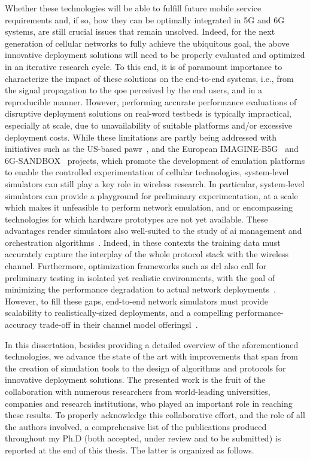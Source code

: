 Whether these technologies will be able to fulfill future mobile service requirements and, if so, how they can be optimally integrated in 5G and 6G systems, are still crucial issues that remain unsolved. 
Indeed, for the next generation of cellular networks to fully achieve the ubiquitous goal, the above innovative deployment solutions will need to be properly evaluated and optimized in an iterative research cycle. To this end, it is of paramount importance to characterize the impact of these solutions on the end-to-end systems, i.e., from the signal propagation to the \gls{qoe} perceived by the end users, and in a reproducible manner.
However, performing accurate performance evaluations of disruptive deployment solutions on real-word testbeds is typically impractical, especially at scale, due to unavailability of suitable platforms and/or excessive deployment costs.
While these limitations are partly being addressed with initiatives such as the US-based \gls{pawr}~\cite{BONATI2023109502}, and the European IMAGINE-B5G~\cite{10597052} and 6G-SANDBOX~\cite{10597112} projects, which promote the development of emulation platforms to enable the controlled experimentation of cellular technologies, system-level simulators can still play a key role in wireless research.
In particular, system-level simulators can provide a playground for preliminary experimentation, at a scale which makes it unfeasible to perform network emulation, and or encompassing technologies for which hardware prototypes are not yet available. 
These advantages render simulators also well-suited to the study of \gls{ai} management and orchestration algorithms~\cite{polese2022colo}.
Indeed, in these contexts the training data must accurately capture the interplay of the whole protocol stack with the wireless channel. Furthermore, optimization frameworks such as \gls{drl} also call for preliminary testing in isolated yet realistic environments, with the goal of minimizing the performance degradation to actual network deployments~\cite{lacava2022programmable, amir2023safehaul}.
However, to fill these gaps, end-to-end network simulators must provide scalability to realistically-sized deployments, and a compelling performance-accuracy trade-off in their channel model offeringsl~\cite{testolina2020scalable}.

In this dissertation, besides providing a detailed overview of the aforementioned technologies, we advance the state of the art with improvements that span from the creation of simulation tools to the design of algorithms and protocols for innovative deployment solutions.
The presented work is the fruit of the collaboration with numerous researchers from world-leading universities, companies and research institutions, who played an important role in reaching these results. To properly acknowledge this collaborative effort, and the role of all the
authors involved, a comprehensive list of the publications produced throughout my Ph.D (both accepted, under review and to be submitted) is reported at the end of this thesis. The latter is organized as follows.

